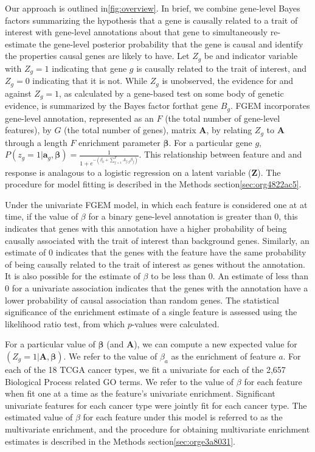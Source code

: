 Our approach is outlined in\ref{fig:overview}. In brief, we combine gene-level Bayes factors summarizing the hypothesis that a gene is causally related to a trait of interest with gene-level annotations about that gene to simultaneously re-estimate the gene-level posterior probability that the gene is causal and identify the properties causal genes are likely to have.  Let $Z_g$ be and indicator variable with $Z_g = 1$ indicating that gene $g$ is causally related to the trait of interest, and $Z_g = 0$ indicating that it is not.  While $Z_g$ is unobserved, the evidence for and against $Z_g=1$, as calculated by a gene-based test on some body of genetic evidence, is summarized by the Bayes factor forthat gene $B_g$.  FGEM incorporates gene-level annotation, represented as an $F$ (the total number of gene-level features), by $G$ (the total number of genes), matrix $\textbf{A}$, by relating $Z_g$ to $\textbf{A}$ through a length $F$  enrichment parameter $\boldsymbol{\beta}$.  For a particular gene $g$, $P(z_g=1|\textbf{a}_g,\boldsymbol{\beta}) =  \frac{1}{1+e^{-(\beta_{0}+\sum_{f=1}^F{A_{f,g}\beta_f})}} $.  This relationship between feature and and response is
analagous to a logistic regression on a latent variable ($\textbf{Z}$).  The procedure for model fitting is described in the Methods section\ref{sec:org4822ac5}.

Under the univariate FGEM model, in which each feature is considered one at at time, if the value of $\beta$ for a binary gene-level annotation is greater than $0$, this indicates that genes with this annotation have a higher probability of being causally associated with the trait of interest than background genes.  Similarly, an estimate of $0$ indicates that the genes with the feature have the same probability of being causally related to the trait of interest as genes without the annotation.  It is also possible for the estimate of $\beta$ to be less than $0$.  An estimate of less than 0 for a univariate association indicates that the genes with the annotation have a lower probability of causal association than random genes.  The statistical significance of the enrichment estimate of a single feature is assessed using the likelihood ratio test, from which $p$-values were calculated.

For a particular value of $\boldsymbol{\beta}$ (and $\textbf{A}$), we can compute a new expected value for $(Z_g = 1 | \textbf{A},\boldsymbol{\beta})$.
We refer to the value of $\beta_a$ as the enrichment of feature $a$.  For each of the 18 TCGA cancer types, we fit a univariate for each of the 2,657 Biological Process related GO terms.  We refer to the value of $\beta$ for each feature when fit one at a time as the feature's univariate enrichment.  Significant univariate features for each cancer type were jointly fit for each cancer type.  The estimated value of $\beta$ for each feature under this model is referred to as the multivariate enrichment, and the procedure for obtaining multivariate enrichment estimates is described in the Methods section\ref{sec:orge3a8031}.

